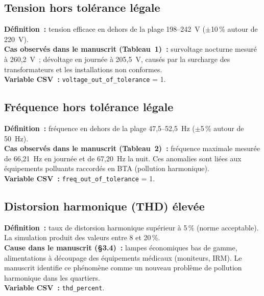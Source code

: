 \documentclass[12pt,a4paper]{article}
\begin{document}
\subsection{Tension hors tolérance légale}

\begin{mdframed}[style=encadre]
\textbf{Définition~:} tension efficace en dehors de la plage 198--242~V
($\pm$10\,\% autour de 220~V).\\
\textbf{Cas observés dans le manuscrit (Tableau~1)~:} survoltage
nocturne mesuré à 260,2~V~; dévoltage en journée à 205,5~V,
causés par la surcharge des transformateurs et les installations
non conformes.\\
\textbf{Variable CSV~:} \texttt{voltage\_out\_of\_tolerance} = 1.
\end{mdframed}

\subsection{Fréquence hors tolérance légale}

\begin{mdframed}[style=encadre]
\textbf{Définition~:} fréquence en dehors de la plage 47,5--52,5~Hz
($\pm$5\,\% autour de 50~Hz).\\
\textbf{Cas observés dans le manuscrit (Tableau~2)~:} fréquence maximale
mesurée de 66,21~Hz en journée et de 67,20~Hz la nuit.
Ces anomalies sont liées aux équipements polluants raccordés en BTA
(pollution harmonique).\\
\textbf{Variable CSV~:} \texttt{freq\_out\_of\_tolerance} = 1.
\end{mdframed}

\subsection{Distorsion harmonique (THD) élevée}

\begin{mdframed}[style=encadre]
\textbf{Définition~:} taux de distorsion harmonique supérieur à 5\,\%
(norme acceptable). La simulation produit des valeurs entre 8 et 20\,\%.\\
\textbf{Cause dans le manuscrit (§3.4)~:} lampes économiques bas de gamme,
alimentations à découpage des équipements médicaux (moniteurs, IRM).
Le manuscrit identifie ce phénomène comme un \og{}nouveau problème
de pollution harmonique dans les quartiers\fg{}.\\
\textbf{Variable CSV~:} \texttt{thd\_percent}.
\end{mdframed}
\end{document}
